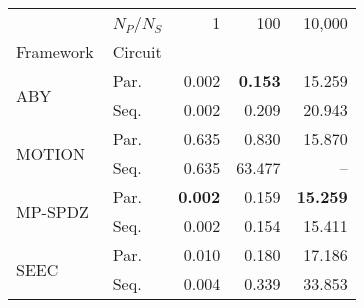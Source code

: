 \begin{tabular}{llrrr}
\toprule
 & $N_P$/$N_S$ & 1 & 100 & 10,000 \\
Framework & Circuit &  &  &  \\
\midrule
\multirow[c]{2}{*}{ABY~\cite{DSZ15}} & Par. & 0.002 & \bfseries 0.153 & 15.259 \\
 & Seq. & 0.002 & 0.209 & 20.943 \\
\cline{1-5}
\multirow[c]{2}{*}{MOTION~\cite{BDST22}} & Par. & 0.635 & 0.830 & 15.870 \\
 & Seq. & 0.635 & 63.477 & -- \\
\cline{1-5}
\multirow[c]{2}{*}{MP-SPDZ~\cite{CCS:Keller20}} & Par. & \bfseries 0.002 & 0.159 & \bfseries 15.259 \\
 & Seq. & 0.002 & 0.154 & 15.411 \\
\cline{1-5}
\multirow[c]{2}{*}{SEEC} & Par. & 0.010 & 0.180 & 17.186 \\
 & Seq. & 0.004 & 0.339 & 33.853 \\
\bottomrule
\end{tabular}
